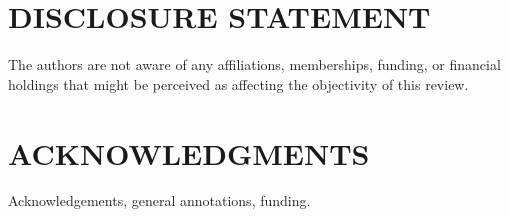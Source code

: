 \documentclass[letterpaper]{ar-1col}
\begin{document}
\section*{DISCLOSURE STATEMENT}
The authors are not aware of any affiliations, memberships, funding, or financial holdings that
might be perceived as affecting the objectivity of this review.

\section*{ACKNOWLEDGMENTS}
Acknowledgements, general annotations, funding.

%



\end{document}
